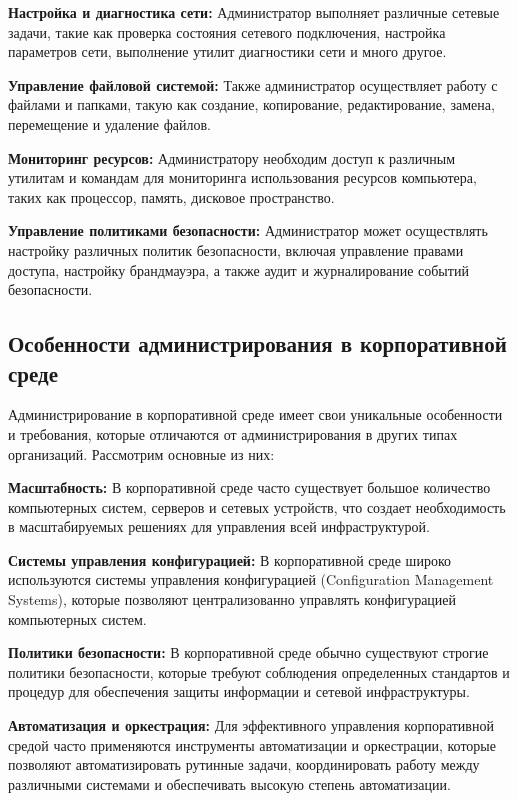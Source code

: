 \textbf{Настройка и диагностика сети:} Администратор выполняет различные сетевые задачи, такие как проверка состояния сетевого подключения, настройка параметров сети, выполнение утилит диагностики сети и много другое.

\textbf{Управление файловой системой:} Также администратор осуществляет работу с файлами и папками, такую как создание, копирование, редактирование, замена, перемещение и удаление файлов.

\textbf{Мониторинг ресурсов:} Администратору необходим доступ к различным утилитам и командам для мониторинга использования ресурсов компьютера, таких как процессор, память, дисковое пространство.

\textbf{Управление политиками безопасности:} Администратор может осуществлять настройку различных политик безопасности, включая управление правами доступа, настройку брандмауэра, а также аудит и журналирование событий безопасности.

\subsection{Особенности администрирования в корпоративной среде}

Администрирование в корпоративной среде имеет свои уникальные особенности и требования, которые отличаются от администрирования в других типах организаций. Рассмотрим основные из них:

\textbf{Масштабность:} В корпоративной среде часто существует большое количество компьютерных систем, серверов и сетевых устройств, что создает необходимость в масштабируемых решениях для управления всей инфраструктурой.

\textbf{Системы управления конфигурацией:} В корпоративной среде широко используются системы управления конфигурацией (Configuration Management Systems), которые позволяют централизованно управлять конфигурацией компьютерных систем.

\textbf{Политики безопасности:} В корпоративной среде обычно существуют строгие политики безопасности, которые требуют соблюдения определенных стандартов и процедур для обеспечения защиты информации и сетевой инфраструктуры.

\textbf{Автоматизация и оркестрация:} Для эффективного управления корпоративной средой часто применяются инструменты автоматизации и оркестрации, которые позволяют автоматизировать рутинные задачи, координировать работу между различными системами и обеспечивать высокую степень автоматизации.

